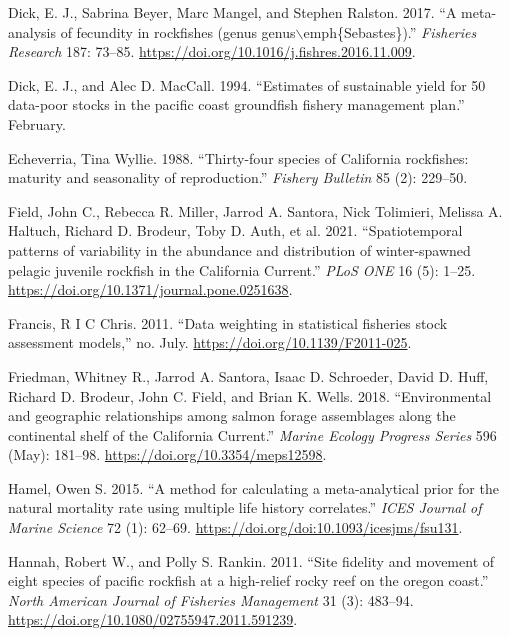 \documentclass[
  english,
  a4paper,
]{article}
\newlength{\cslhangindent}
\newlength{\cslentryspacingunit} %
\newenvironment{CSLReferences}[2] %
 {%
  \setlength{\parindent}{0pt}
  \ifodd #1
  \let\oldpar\par
  \def\par{\hangindent=\cslhangindent\oldpar}
  \fi
  \setlength{\parskip}{#2\cslentryspacingunit}
 }%
 {}
\begin{document}
\begin{CSLReferences}{1}{0}
\leavevmode{}%
Dick, E. J., Sabrina Beyer, Marc Mangel, and Stephen Ralston. 2017. {``{A meta-analysis of fecundity in rockfishes (genus genus\(\backslash\)emph{\{}Sebastes{\}})}.''} \emph{Fisheries Research} 187: 73--85. \url{https://doi.org/10.1016/j.fishres.2016.11.009}.

\leavevmode{}%
Dick, E. J., and Alec D. MacCall. 1994. {``{Estimates of sustainable yield for 50 data-poor stocks in the pacific coast groundfish fishery management plan}.''} February.

\leavevmode{}%
Echeverria, Tina Wyllie. 1988. {``{Thirty-four species of California rockfishes: maturity and seasonality of reproduction}.''} \emph{Fishery Bulletin} 85 (2): 229--50.

\leavevmode{}%
Field, John C., Rebecca R. Miller, Jarrod A. Santora, Nick Tolimieri, Melissa A. Haltuch, Richard D. Brodeur, Toby D. Auth, et al. 2021. {``{Spatiotemporal patterns of variability in the abundance and distribution of winter-spawned pelagic juvenile rockfish in the California Current}.''} \emph{PLoS ONE} 16 (5): 1--25. \url{https://doi.org/10.1371/journal.pone.0251638}.

\leavevmode{}%
Francis, R I C Chris. 2011. {``{Data weighting in statistical fisheries stock assessment models},''} no. July. \url{https://doi.org/10.1139/F2011-025}.

\leavevmode{}%
Friedman, Whitney R., Jarrod A. Santora, Isaac D. Schroeder, David D. Huff, Richard D. Brodeur, John C. Field, and Brian K. Wells. 2018. {``{Environmental and geographic relationships among salmon forage assemblages along the continental shelf of the California Current}.''} \emph{Marine Ecology Progress Series} 596 (May): 181--98. \url{https://doi.org/10.3354/meps12598}.

\leavevmode{}%
Hamel, Owen S. 2015. {``{A method for calculating a meta-analytical prior for the natural mortality rate using multiple life history correlates}.''} \emph{ICES Journal of Marine Science} 72 (1): 62--69. \url{https://doi.org/doi:10.1093/icesjms/fsu131}.

\leavevmode{}%
Hannah, Robert W., and Polly S. Rankin. 2011. {``{Site fidelity and movement of eight species of pacific rockfish at a high-relief rocky reef on the oregon coast}.''} \emph{North American Journal of Fisheries Management} 31 (3): 483--94. \url{https://doi.org/10.1080/02755947.2011.591239}.


\end{CSLReferences}
\end{document}
